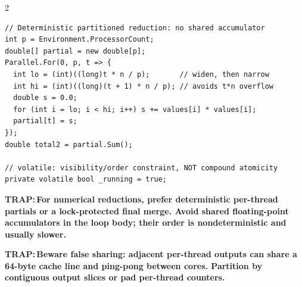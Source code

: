 \documentclass[9pt,a4paper]{extarticle}
\newenvironment{card}[3][acBlue]{%
  \begin{tcolorbox}[
    enhanced, colback=#2, colframe=bdCard,
    coltitle=black, colbacktitle=#2!70!bgHdr,
    fonttitle=\bfseries\fontsize{6.16pt}{7.48pt}\selectfont\MakeUppercase,
    title={#3},
    left=3pt, right=2pt, top=1.4pt, bottom=1.8pt,
    toptitle=1pt, bottomtitle=1pt,
    boxrule=0.4pt,
    borderline west={3pt}{0pt}{#1},
    arc=2pt, before skip=0pt, after skip=1.6mm,
    breakable, toprule at break=0pt, bottomrule at break=0pt,
  ]}{\end{tcolorbox}}
\newcommand{\trap}[1]{\par\noindent
  \begin{minipage}{\linewidth}%
  {\fontsize{5.6pt}{6.8pt}\selectfont\color{trap}\bfseries TRAP:\,#1}%
  \end{minipage}\par}
\begin{document}
\begin{multicols}{2}
\begin{card}[acNavy]{bgNavy}{Parallel \& Thread Safety}
\begin{lstlisting}[style=cs]
// Deterministic partitioned reduction: no shared accumulator
int p = Environment.ProcessorCount;
double[] partial = new double[p];
Parallel.For(0, p, t => {
  int lo = (int)((long)t * n / p);       // widen, then narrow
  int hi = (int)((long)(t + 1) * n / p); // avoids t*n overflow
  double s = 0.0;
  for (int i = lo; i < hi; i++) s += values[i] * values[i];
  partial[t] = s;
});
double total2 = partial.Sum();

// volatile: visibility/order constraint, NOT compound atomicity
private volatile bool _running = true;
\end{lstlisting}
\trap{For numerical reductions, prefer deterministic per-thread partials
or a lock-protected final merge. Avoid shared floating-point accumulators in
the loop body; their order is nondeterministic and usually slower.}
\trap{Beware false sharing: adjacent per-thread outputs can share a 64-byte
cache line and ping-pong between cores. Partition by contiguous output slices
or pad per-thread counters.}
\end{card}

\end{multicols}
\end{document}
